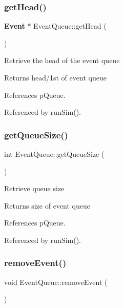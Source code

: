 \mbox{\label{classEventQueue_a22247fa958f0f7c59c6efa4221cec086}} 
\subsubsection{get\+Head()}
{\footnotesize\ttfamily \textbf{ Event} $\ast$ Event\+Queue\+::get\+Head (\begin{DoxyParamCaption}{ }\end{DoxyParamCaption})}

Retrieve the head of the event queue \begin{DoxyReturn}{Returns}
head/1st of event queue 
\end{DoxyReturn}


References p\+Queue.



Referenced by run\+Sim().

\mbox{\label{classEventQueue_a1657a805dc38663bbdca6996f1f75ec0}} 
\subsubsection{get\+Queue\+Size()}
{\footnotesize\ttfamily int Event\+Queue\+::get\+Queue\+Size (\begin{DoxyParamCaption}{ }\end{DoxyParamCaption})}

Retrieve queue size \begin{DoxyReturn}{Returns}
size of event queue 
\end{DoxyReturn}


References p\+Queue.



Referenced by run\+Sim().

\mbox{\label{classEventQueue_ac8b2d6de9e9275356fe893950f26a84b}} 
\subsubsection{remove\+Event()}
{\footnotesize\ttfamily void Event\+Queue\+::remove\+Event (\begin{DoxyParamCaption}{ }\end{DoxyParamCaption})}


